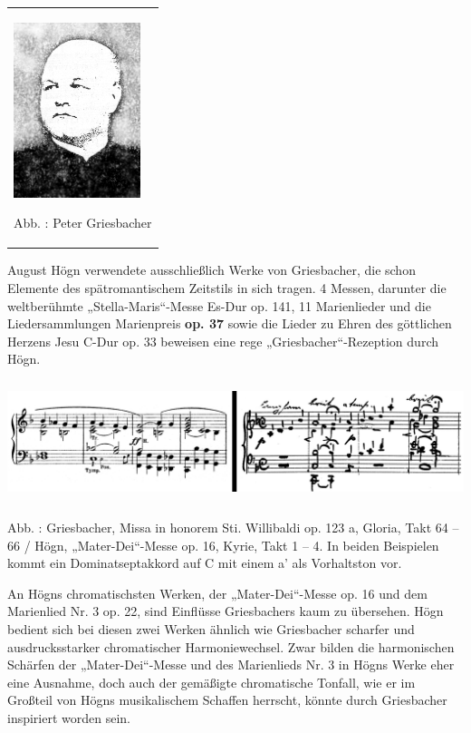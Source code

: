 \begin{center}
\begin{minipage}{4.076cm}
\begin{flushleft}
\tablefirsthead{}
\tablehead{}
\tabletail{}
\tablelasttail{}
\begin{supertabular}{m{3.8760002cm}}

\includegraphics[width=3.694cm,height=5.106cm]{pictures/zulassungsarbeit-img091.jpg}

Abb. : Peter Griesbacher\\
\end{supertabular}
\end{flushleft}
\end{minipage}
\end{center}
August Högn verwendete ausschließlich Werke von Griesbacher, die schon
Elemente des spätromantischem Zeitstils in sich tragen. 4 Messen,
darunter die weltberühmte „Stella-Maris“-Messe Es-Dur op. 141, 11
Marienlieder und die Liedersammlungen Marienpreis \textbf{\textmd{op.
37} }sowie die Lieder zu Ehren des göttlichen Herzens Jesu C-Dur op. 33
beweisen eine rege „Griesbacher“-Rezeption durch Högn.


\includegraphics[width=15.977cm,height=3.53cm]{pictures/zulassungsarbeit-img092.png}


Abb. : Griesbacher, Missa in honorem Sti.
Willibaldi op. 123 a, Gloria, Takt 64 – 66 / Högn, „Mater-Dei“-Messe
op. 16, Kyrie, Takt 1 – 4. In beiden Beispielen kommt ein
Dominatseptakkord auf C mit einem a’ als Vorhaltston vor.

An Högns chromatischsten Werken, der „Mater-Dei“-Messe op. 16 und dem
Marienlied Nr. 3 op. 22, sind Einflüsse Griesbachers kaum zu übersehen.
Högn bedient sich bei diesen zwei Werken ähnlich wie Griesbacher
scharfer und ausdrucksstarker chromatischer Harmoniewechsel. Zwar
bilden die harmonischen Schärfen der „Mater-Dei“-Messe und des
Marienlieds Nr. 3 in Högns Werke eher eine Ausnahme, doch auch der
gemäßigte chromatische Tonfall, wie er im Großteil von Högns
musikalischem Schaffen herrscht, könnte durch Griesbacher inspiriert
worden sein.

